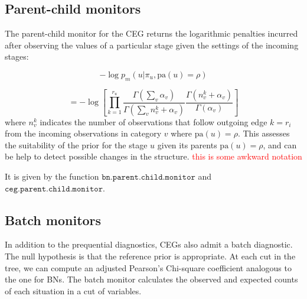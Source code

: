 \documentclass[12pt]{article}
\begin{document}
\subsection{Parent-child monitors}

The parent-child monitor for the CEG returns the logarithmic penalties incurred after observing the values of a particular stage given the settings of the incoming stages:

\[
-\log p_m( u | \pi_u, \text{pa}(u) = \rho)
\]
 
 \[
=-\log \left[ \prod_{k=1} ^ {r_u} \frac{\Gamma (\sum_v \alpha_v)}{\Gamma(\sum_v n_v^k + \alpha_v)}  \frac{\Gamma(n_v^k + \alpha_v)}{\Gamma(\alpha_v)} \right]
 \]
  where $n_v^k$ indicates the number of observations that follow outgoing edge $k=r_i$ from the incoming observations in category $v$ where $\text{pa}(u) = \rho$. This assesses the suitability of the prior for the stage $u$ given its parents  $\text{pa}(u) = \rho$, and can be help to detect possible changes in the structure. \textcolor{red}{this is some awkward notation}
  
  It is given by the function $\texttt{bn.parent.child.monitor}$ and $\texttt{ceg.parent.child.monitor}$. 

%
%
\subsection{Batch monitors}
In addition to the prequential diagnostics, CEGs also admit a batch diagnostic. The null hypothesis is that the reference prior is appropriate. At each cut in the tree, we can compute an adjusted Pearson's Chi-square coefficient analogous to the one for BNs. The batch monitor calculates the observed and expected counts of each situation in a cut of variables.
 
\end{document}
